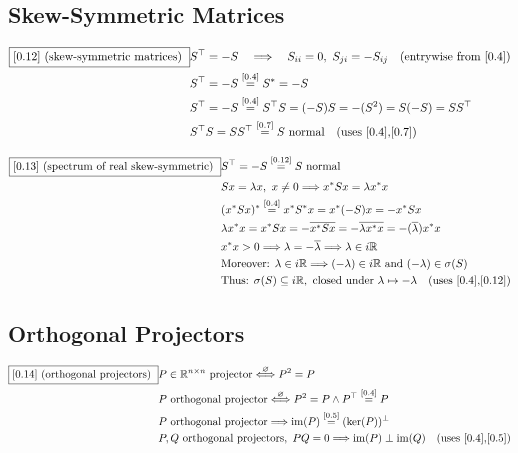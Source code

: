 \documentclass[11pt]{article}
\newcommand{\eqref}[1]{\overset{[#1]}{=}}
\begin{document}
\subsection{Skew-Symmetric Matrices}

\begin{align}
\boxed{[0.12] \text{ (skew-symmetric matrices) }}
&S^\top
=
-S
\quad\Longrightarrow\quad
S_{ii}
=
0,\
S_{ji}
=
-S_{ij}
\quad(\text{entrywise from [0.4]}) \notag\\
&S^\top
=
-S
\eqref{0.4}
S^*
=
-S \notag\\
&S^\top = -S
\eqref{0.4}
S^\top S
=
(-S)S
=
-(S^2)
=
S(-S)
=
SS^\top \notag\\
&S^\top S=SS^\top
\eqref{0.7}
S
\text{ normal}
\quad(\text{uses [0.4],[0.7]})
\end{align}

\begin{align}
\boxed{[0.13] \text{ (spectrum of real skew-symmetric) }}
&S^\top = -S
\eqref{0.12}
S
\text{ normal} \notag\\
&Sx=\lambda x,\ x\neq 0
\Longrightarrow
x^* S x
=
\lambda x^* x \notag\\
&(x^* S x)^*
\eqref{0.4}
x^* S^* x
=
x^*(-S)x
=
-x^* S x \notag\\
&\lambda x^* x
=
x^* S x
=
-\overline{x^* S x}
=
-\overline{\lambda x^* x}
=
-(\overline{\lambda}) x^* x \notag\\
&x^* x >0
\Longrightarrow
\lambda
=
-\overline{\lambda}
\Longrightarrow
\lambda \in i\mathbb{R} \notag\\
&\text{Moreover: }\lambda\in i\mathbb{R}
\Longrightarrow
(-\lambda)\in i\mathbb{R}
\text{ and }
(-\lambda)
\in\sigma(S) \notag\\
&\text{Thus: }\sigma(S)
\subseteq i\mathbb{R},\
\text{closed under }\lambda\mapsto-\lambda
\quad(\text{uses [0.4],[0.12]})
\end{align}

\subsection{Orthogonal Projectors}

\begin{align}
\boxed{[0.14] \text{ (orthogonal projectors) }}
&P\in\mathbb{R}^{n\times n}
\text{ projector}
\overset{\varnothing}{\Longleftrightarrow}
P^2=P \notag\\
&P
\text{ orthogonal projector}
\overset{\varnothing}{\Longleftrightarrow}
P^2=P
\wedge
P^\top
\eqref{0.4}
P \notag\\
&P
\text{ orthogonal projector}
\Longrightarrow
\operatorname{im}(P)
\eqref{0.5}
(\ker(P))^\perp \notag\\
&P,Q
\text{ orthogonal projectors},\
PQ=0
\Longrightarrow
\operatorname{im}(P)\perp\operatorname{im}(Q)
\quad(\text{uses [0.4],[0.5]})
\end{align}
\end{document}
